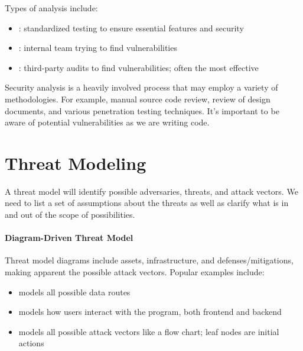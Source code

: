 Types of analysis include:
\begin{itemize}[noitemsep]
    \item {}: standardized testing to ensure essential features and security
    \item {}: internal team trying to find vulnerabilities
    \item {}: third-party audits to find vulnerabilities; often the most effective
\end{itemize}

Security analysis is a heavily involved process that may employ a variety of methodologies. For example, manual source code review, review of design documents, and various penetration testing techniques. It's important to be aware of potential vulnerabilities as we are writing code.

\section{Threat Modeling}
A threat model will identify possible adversaries, threats, and attack vectors. We need to list a set of assumptions about the threats as well as clarify what is in and out of the scope of possibilities.

\paragraph{Diagram-Driven Threat Model}
Threat model diagrams include assets, infrastructure, and defenses/mitigations, making apparent the possible attack vectors. Popular examples include:
\begin{itemize}[noitemsep]
    \item {} models all possible data routes
    \item {} models how users interact with the program, both frontend and backend
    \item {} models all possible attack vectors like a flow chart; leaf nodes are initial actions
\end{itemize}

